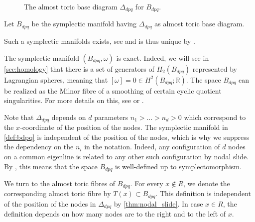 \documentclass[12pt,a4paper,draft]{scrartcl}
\begin{document}
\begin{figure}
\centering
{}   
\caption{The almost toric base diagram $Δ_{dpq}$ for $B_{dpq}$.}
\label{fig:Bdpq_moment_image}
\end{figure}

\begin{definition}
    \label{def:bdpq}
    Let $B_{dpq}$ be the symplectic manifold having $\Delta_{dpq}$ as almost toric base diagram.
\end{definition}

Such a symplectic manifolds exists, see \cite[Section 7.4]{evans2021atfs} and is thus unique by \cite[Theorem 8.5]{evans2021atfs}. 

\begin{remark}
    The symplectic manifold $(B_{dpq}, \omega)$ is exact.
Indeed, we will see in \cref{sec:homology} that there is a set of generators of $H_2(B_{dpq})$ represented by Lagrangian spheres, meaning that $[\omega] = 0 \in H^2(B_{dpq};\mathbb{R})$. The space $B_{dpq}$ can be realized as the Milnor fibre of a smoothing of certain cyclic quotient singularities.
For more details on this, see \cite[Section 7.4]{evans2021atfs} or \cite{Eva19}.
\end{remark}

Note that $\Delta_{dpq}$ depends on $d$ parameters $n_1>\ldots>n_d > 0$ which correspond to the $x$-coordinate of the position of the nodes.
The symplectic manifold in \cref{def:bdpq} is independent of the position of the nodes, which is why we suppress the dependency on the $n_i$ in the notation.
Indeed, any configuration of $d$ nodes on a common eigenline is related to any other such configuration by nodal slide.
By \cite[Theorem 8.10]{evans2021atfs}, this means that the space $B_{dpq}$ is well-defined up to symplectomorphism.

We turn to the almost toric fibres of $B_{dpq}$.
For every $x \notin R$, we denote the corresponding almost toric fibre by $T(x) \subset B_{dpq}$. This definition is independent of the position of the nodes in $\Delta_{dpq}$ by \cref{thm:nodal_slide}.
In case $x \in R$, the definition depends on how many nodes are to the right and to the left of $x$.
\end{document}

